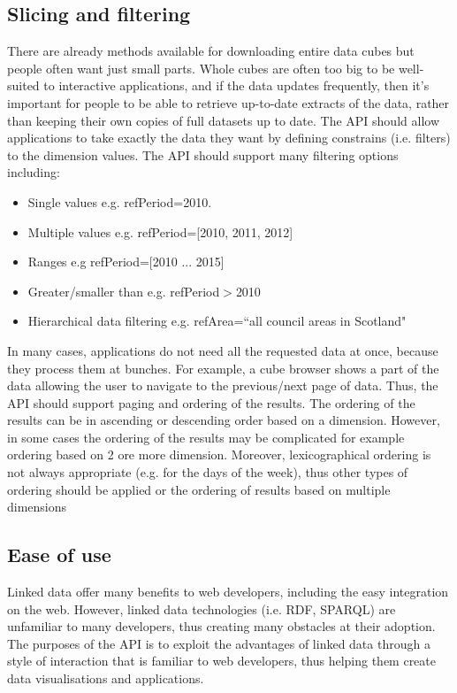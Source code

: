 \documentclass{llncs}
\begin{document}
\subsection{Slicing and filtering}\label{sec:slice}

There are already methods available for downloading entire data cubes but people often want just small parts.  Whole cubes are often too big to be well-suited to interactive applications, and if the data updates frequently,  then it's important for people to be able to retrieve up-to-date extracts of the data, rather than keeping their own copies of full datasets up to date. The API should allow applications to take exactly the data they want by defining constrains (i.e. filters) to the dimension values. The API should support many filtering options including:
\begin{itemize}
\item Single values e.g. refPeriod=2010.
\item Multiple values e.g. refPeriod=[2010, 2011, 2012]
\item Ranges e.g refPeriod=[2010 ... 2015]
\item Greater/smaller than e.g. refPeriod$>$2010
\item Hierarchical data filtering e.g. refArea=``all council areas in Scotland"
\end{itemize}

In many cases, applications do not need all the requested data at once, because they process them at bunches. For example, a cube browser shows a part of the data allowing the user to navigate to the previous/next page of data. Thus, the API should support paging and ordering of the results. The ordering of the results can be in ascending or descending order based on a dimension. However, in some cases the ordering of the results may be complicated for example ordering based on 2 ore more dimension. Moreover, lexicographical ordering is not always appropriate (e.g. for the days of the week), thus other types of ordering should be applied or the ordering of results based on multiple dimensions



\subsection{Ease of use}

Linked data offer many benefits to web developers, including the easy integration on the web. However, linked data technologies (i.e. RDF, SPARQL) are unfamiliar to many developers, thus creating many obstacles at their adoption. The purposes of the API is to exploit the advantages of linked data through a style of interaction that is familiar to web developers, thus helping them create data visualisations and applications.
\end{document}
